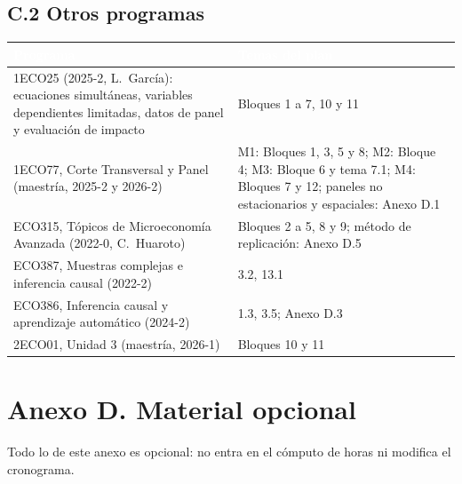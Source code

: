 \documentclass[11pt,a4paper]{article}
\newcommand{\cab}[1]{\textcolor{white}{\sffamily\bfseries #1}}
\newcommand{\filasalternas}{\rowcolors{2}{white}{tonoPalido}}
\begin{document}
\subsection*{C.2 Otros programas}
{\small\filasalternas
\noindent\begin{tabularx}{\textwidth}{>{\raggedright\arraybackslash}p{6.2cm}X}
\toprule
\rowcolor{tonoOscuro}\cab{Programa} & \cab{Temas del plan} \\
\midrule
1ECO25 (2025-2, L.~García): ecuaciones simultáneas, variables dependientes limitadas, datos de panel y evaluación de impacto & Bloques 1 a 7, 10 y 11 \\
1ECO77, Corte Transversal y Panel (maestría, 2025-2 y 2026-2) & M1: Bloques 1, 3, 5 y 8; M2: Bloque 4; M3: Bloque 6 y tema 7.1; M4: Bloques 7 y 12; paneles no estacionarios y espaciales: Anexo D.1 \\
ECO315, Tópicos de Microeconomía Avanzada (2022-0, C.~Huaroto) & Bloques 2 a 5, 8 y 9; método de replicación: Anexo D.5 \\
ECO387, Muestras complejas e inferencia causal (2022-2) & 3.2, 13.1 \\
ECO386, Inferencia causal y aprendizaje automático (2024-2) & 1.3, 3.5; Anexo D.3 \\
2ECO01, Unidad 3 (maestría, 2026-1) & Bloques 10 y 11 \\
\bottomrule
\end{tabularx}
}

\section*{Anexo D. Material opcional}

Todo lo de este anexo es opcional: no entra en el cómputo de horas ni modifica
el cronograma.
\end{document}
